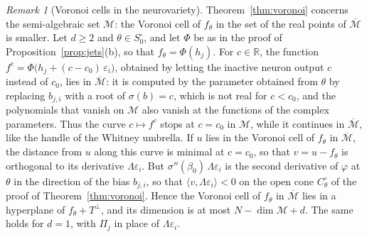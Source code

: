 \documentclass[11pt]{article}
\theoremstyle{definition}
\theoremstyle{remark}
\newtheorem{remark}[lemma]{Remark}
\newcommand{\R}{\mathbb{R}}
\newcommand{\M}{\mathcal{M}}
\newcommand{\Mbar}{\overline{\M}}
\begin{document}
\begin{remark}[Voronoi cells in the neurovariety]\label{rem:voronoi}
Theorem~\ref{thm:voronoi} concerns the semi-algebraic set $\M$: the Voronoi cell of $f_\theta$ in the set of the real points of $\Mbar$ is smaller. Let $d\ge2$ and $\theta\in S_0^\circ$, and let $\Phi$ be as in the proof of Proposition~\ref{prop:jets}(b), so that $f_\theta=\Phi(h_j)$. For $c\in\R$, the function $f^c=\Phi\big(h_j+(c-c_0)\,\varepsilon_i\big)$, obtained by letting the inactive neuron output $c$ instead of $c_0$, lies in $\Mbar$: it is computed by the parameter obtained from $\theta$ by replacing $b_{j,i}$ with a root of $\sigma(b)=c$, which is not real for $c<c_0$, and the polynomials that vanish on $\M$ also vanish at the functions of the complex parameters. Thus the curve $c\mapsto f^c$ stops at $c=c_0$ in $\M$, while it continues in $\Mbar$, like the handle of the Whitney umbrella. If $u$ lies in the Voronoi cell of $f_\theta$ in $\Mbar$, the distance from $u$ along this curve is minimal at $c=c_0$, so that $v=u-f_\theta$ is orthogonal to its derivative $\Lambda\varepsilon_i$. But $\sigma''(\beta_0)\,\Lambda\varepsilon_i$ is the second derivative of $\varphi$ at $\theta$ in the direction of the bias $b_{j,i}$, so that $\langle v,\Lambda\varepsilon_i\rangle<0$ on the open cone $C_\theta^\circ$ of the proof of Theorem~\ref{thm:voronoi}. Hence the Voronoi cell of $f_\theta$ in $\Mbar$ lies in a hyperplane of $f_\theta+T^\perp$, and its dimension is at most $N-\dim\M+d$. The same holds for $d=1$, with $\Pi_j$ in place of $\Lambda\varepsilon_i$.
\end{remark}
\end{document}
